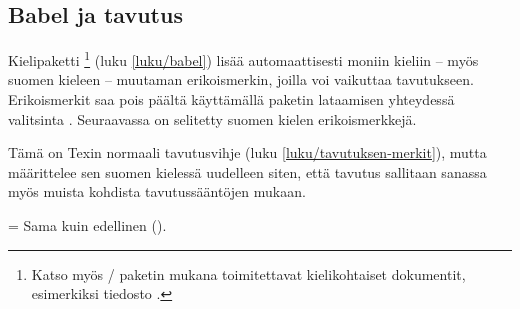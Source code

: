 \subsection{Babel ja tavutus}
\label{luku/tavutus-babel}

Kielipaketti \yipilkku\footnote{Katso myös
  \-/ paketin mukana toimitettavat kielikohtaiset
  dokumentit, esimerkiksi tiedosto .} (luku
\ref{luku/babel}) lisää automaattisesti moniin kieliin -- myös suomen
kieleen -- muutaman erikoismerkin, joilla voi vaikuttaa tavutukseen.
Erikoismerkit saa pois päältä käyttämällä paketin lataamisen yhteydessä
valitsinta . Seuraavassa on selitetty suomen
kielen erikoismerkkejä.

\begin{maaritelma}{}
\item [\komento{-}] Tämä on Texin normaali tavutusvihje (luku
  \ref{luku/tavutuksen-merkit}), mutta  määrittelee sen
  suomen kielessä uudelleen siten, että tavutus sallitaan sanassa myös
  muista kohdista tavutussääntöjen mukaan.

  \shorthandsyhdysmerkki

\item [\textquotedbl=] Sama kuin edellinen (\koodi{\textquotedbl-}).

  \shorthandspystyviiva

  \shorthandslainausmerkki

\end{maaritelma}

